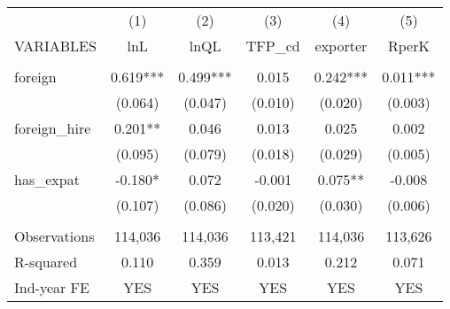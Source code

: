 \begin{tabular}{lccccc} \hline
 & (1) & (2) & (3) & (4) & (5) \\
VARIABLES & lnL & lnQL & TFP\_cd & exporter & RperK \\ \hline
 &  &  &  &  &  \\
foreign & 0.619*** & 0.499*** & 0.015 & 0.242*** & 0.011*** \\
 & (0.064) & (0.047) & (0.010) & (0.020) & (0.003) \\
foreign\_hire & 0.201** & 0.046 & 0.013 & 0.025 & 0.002 \\
 & (0.095) & (0.079) & (0.018) & (0.029) & (0.005) \\
has\_expat & -0.180* & 0.072 & -0.001 & 0.075** & -0.008 \\
 & (0.107) & (0.086) & (0.020) & (0.030) & (0.006) \\
 &  &  &  &  &  \\
Observations & 114,036 & 114,036 & 113,421 & 114,036 & 113,626 \\
R-squared & 0.110 & 0.359 & 0.013 & 0.212 & 0.071 \\
 Ind-year FE & YES & YES & YES & YES & YES \\ \hline
\end{tabular}
